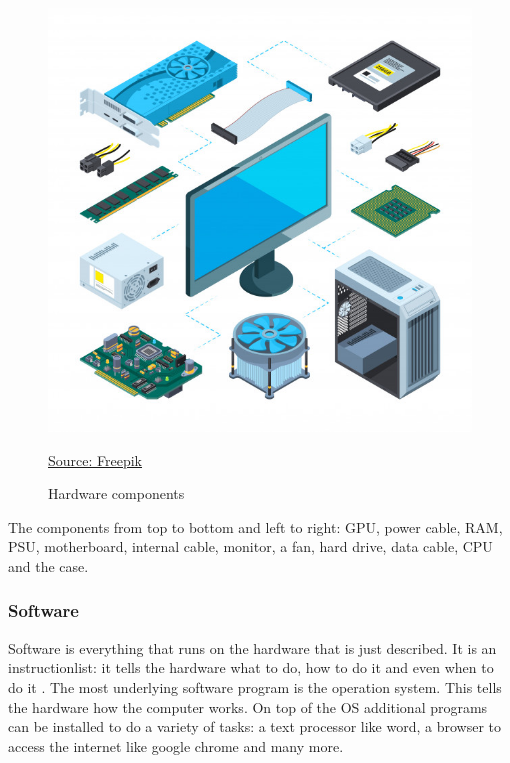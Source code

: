 \begin{figure} [h]
    \centering
    \includegraphics[width=\textwidth]{img/hardware.jpg}
        \caption{Hardware components}
        \label{fig:hardware}
        \href{https://nl.freepik.com/premium-vector/computer-hardware_4618150.htm}{Source: Freepik}
\end{figure}

The components from top to bottom and left to right: GPU, power cable, RAM, PSU, motherboard, internal cable, monitor, a fan, hard drive, data cable, CPU and the case.


\subsubsection{Software} \label{software}
Software is everything that runs on the hardware that is just described. It is an instructionlist: it tells the hardware what to do, how to do it and even when to do it \autocite{software}.
The most underlying software program is the operation system. This tells the hardware how the computer works. On top of the OS additional programs can be installed to do a variety of tasks: a text processor like word, a browser to access the internet like google chrome and many more.


